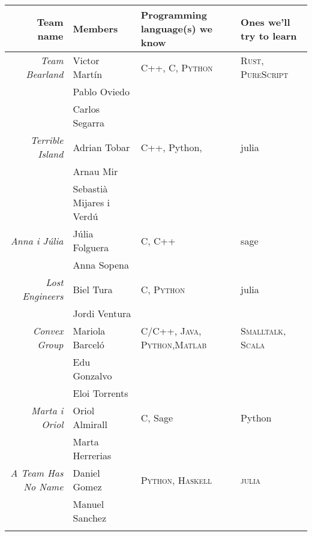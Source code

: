 \documentclass[11pt]{amsart}
\begin{document}
\bigskip
\begin{center}
  \begin{tabular}[c]{r|l|l|l}
    Team name
    & Members
    & Programming language(s) we know
    & Ones we'll try to learn
    \\\hline
    \emph{Team Bearland}
    & Victor Mart\'in
      & \textsc{C++}, \textsc{C}, \textsc{Python} & \textsc{Rust}, \textsc{PureScript} \\
      & Pablo Oviedo & \\
      & Carlos Segarra &               
    \\\hline
    \emph{Terrible Island}
    & Adrian Tobar
    & C++, Python, & julia \\
    & Arnau Mir & \\
    & Sebastià Mijares i Verdú &
    \\\hline
    \emph{Anna i Júlia}
    & Júlia Folguera
    & C, C++  & sage  \\
    & Anna Sopena &
    \\\hline
    \emph{Lost Engineers}
    & Biel Tura
    & \textsc{C}, \textsc{Python}  & julia  \\
    & Jordi Ventura &
    \\\hline

    \emph{Convex Group}
    & Mariola Barceló
    & \textsc{C/C++}, \textsc{Java}, \textsc{Python},\textsc{Matlab}  &  \textsc{Smalltalk}, \textsc{Scala}   \\
    & Edu Gonzalvo & \\
    & Eloi Torrents &  
    \\\hline
    
    \emph{Marta i Oriol}
    & Oriol Almirall
    & \textsc{C}, Sage & Python\\
    & Marta Herrerias &
    \\\hline

    \emph{A Team Has No Name}
    & Daniel Gomez 
    &  \textsc{Python},  \textsc{Haskell}  &  \textsc{julia} \\
    & Manuel Sanchez \\  
	\\\hline
	
  \end{tabular}
\end{center}
\end{document}
